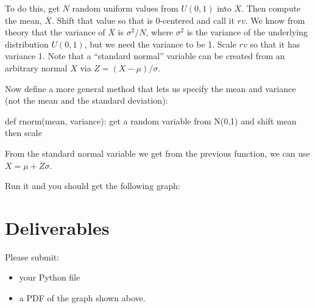 \begin{fullwidth}
To do this, get $N$ random uniform values from $U(0,1)$ into $X$. Then compute the mean, $\overline X$. Shift that value so that is 0-centered and call it $rv$. We know from theory that the variance of $\overline X$ is $\sigma^2 / N$, where $\sigma^2$ is the variance of the underlying distribution $U(0,1)$, but we need the variance to be 1. Scale $rv$ so that it has variance 1. Note that a ``standard normal'' variable can be created from an arbitrary normal $X$ via $Z = (X-\mu)/\sigma$.

\step Now define a more general method that lets us specify the mean and variance (not the mean and the standard deviation):

\begin{pyverbatim}
def rnorm(mean, variance):
    get a random variable from N(0,1) and shift mean then scale
\end{pyverbatim}	

From the standard normal variable we get from the previous function, we can use $X = \mu+ Z\sigma$.

\step Run it and you should get the following graph:


\section{Deliverables}

Please submit:

\begin{itemize}
\item your Python file
\item a PDF of the graph shown above.
\end{itemize}

\end{fullwidth}


